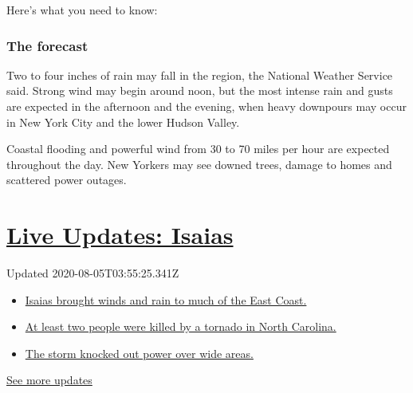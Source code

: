 Here's what you need to know:

\hypertarget{the-forecast}{%
\subsubsection{The forecast}\label{the-forecast}}

Two to four inches of rain may fall in the region, the National Weather
Service said. Strong wind may begin around noon, but the most intense
rain and gusts are expected in the afternoon and the evening, when heavy
downpours may occur in New York City and the lower Hudson Valley.

Coastal flooding and powerful wind from 30 to 70 miles per hour are
expected throughout the day. New Yorkers may see downed trees, damage to
homes and scattered power outages.

\hypertarget{live-updates-isaias}{%
\section{\texorpdfstring{\href{https://www.nytimes.com/2020/08/04/us/isaias-storm-updates.html?action=click\&pgtype=Article\&state=default\&region=MAIN_CONTENT_1\&context=storylines_live_updates}{Live
Updates: Isaias}}{Live Updates: Isaias}}\label{live-updates-isaias}}

Updated 2020-08-05T03:55:25.341Z

\begin{itemize}
\tightlist
\item
  \href{https://www.nytimes.com/2020/08/04/us/isaias-storm-updates.html?action=click\&pgtype=Article\&state=default\&region=MAIN_CONTENT_1\&context=storylines_live_updates\#link-38d68049}{Isaias
  brought winds and rain to much of the East Coast.}
\item
  \href{https://www.nytimes.com/2020/08/04/us/isaias-storm-updates.html?action=click\&pgtype=Article\&state=default\&region=MAIN_CONTENT_1\&context=storylines_live_updates\#link-7961bdbc}{At
  least two people were killed by a tornado in North Carolina.}
\item
  \href{https://www.nytimes.com/2020/08/04/us/isaias-storm-updates.html?action=click\&pgtype=Article\&state=default\&region=MAIN_CONTENT_1\&context=storylines_live_updates\#link-3480f4a1}{The
  storm knocked out power over wide areas.}
\end{itemize}

\href{https://www.nytimes.com/2020/08/04/us/isaias-storm-updates.html?action=click\&pgtype=Article\&state=default\&region=MAIN_CONTENT_1\&context=storylines_live_updates}{See
more updates}

